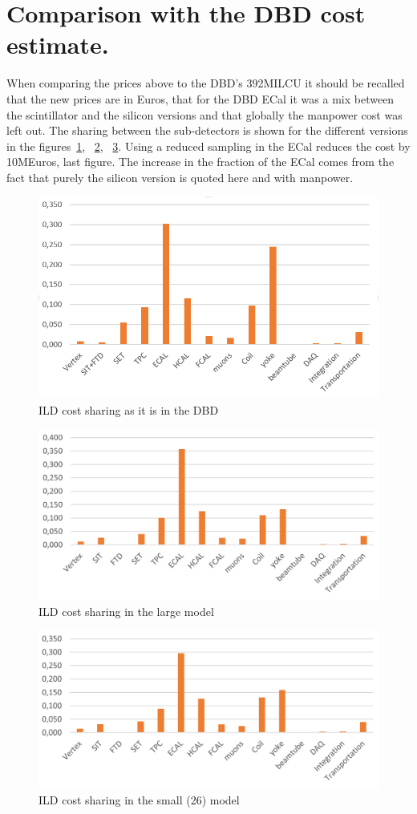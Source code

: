 \section{Comparison with the DBD cost estimate.}
 When comparing the prices above to the DBD's 392MILCU it should be recalled that the new prices are in Euros, that for the DBD ECal it was a mix between the scintillator and the silicon versions  and that globally the manpower cost was left out. The sharing between the sub-detectors is shown for the different versions in the figures~\ref{fig:det:DBD_cost_sharing}, ~\ref{Costing:Large_cost_sharing}, ~\ref{Costing:Small_cost_sharing}. Using a reduced sampling in the ECal reduces the cost by 10MEuros, last figure. The increase in the fraction of the ECal comes from the fact that purely the silicon version is quoted here and with manpower. 
\begin{figure}[h!]
\centering
\includegraphics[width=0.8\hsize]{Detector/fig/DBD_cost_sharing.PNG}
\caption{ILD cost sharing as it is in the DBD}
\label{fig:det:DBD_cost_sharing}
\end{figure}

\begin{figure}[h!]
\centering
\includegraphics[width=0.8\hsize]{Costing/Large_cost_sharing.PNG}
\caption{ILD cost sharing in the large model}
\label{Costing:Large_cost_sharing}
\end{figure}

\begin{figure}[h!]
\centering
\includegraphics[width=0.8\hsize]{Costing/Small_cost_sharing.PNG}
\caption{ILD cost sharing in the small (26) model}
\label{Costing:Small_cost_sharing}
\end{figure}
